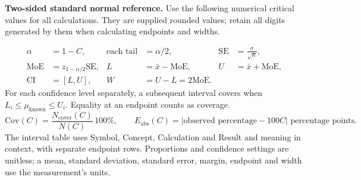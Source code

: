 \textbf{Two-sided standard normal reference.} Use the following numerical critical values for all calculations. They are supplied rounded values; retain all digits generated by them when calculating endpoints and widths.
\par\noindent\begin{minipage}{\linewidth}
\begin{minipage}[t]{.49\linewidth}\vspace{0pt}
\end{minipage}\hfill
\begin{minipage}[t]{.49\linewidth}\vspace{0pt}
\end{minipage}
\end{minipage}\par
\[
\begin{aligned}
\alpha&=1-C,& \text{each tail}&=\alpha/2,&\mathrm{SE}&=\frac{\sigma}{\sqrt n},\\
\mathrm{MoE}&=z_{1-\alpha/2}\mathrm{SE},&L&=\bar x-\mathrm{MoE},&U&=\bar x+\mathrm{MoE},\\
\mathrm{CI}&=[L,U],&W&=U-L=2\mathrm{MoE}.&&
\end{aligned}
\]
For each confidence level separately, a subsequent interval covers when
$L_i\leq\mu_{\mathrm{known}}\leq U_i$. Equality at an endpoint counts as coverage.
\[
\mathrm{Cov}(C)=\frac{N_{\mathrm{cover}}(C)}{N(C)}\,100\%,\qquad
E_{\mathrm{abs}}(C)=|\text{observed percentage}-100C|\text{ percentage points}.
\]
The interval table uses Symbol, Concept, Calculation and Result and meaning in context, with separate endpoint rows. Proportions and confidence settings are unitless; a mean, standard deviation, standard error, margin, endpoint and width use the measurement's units.

